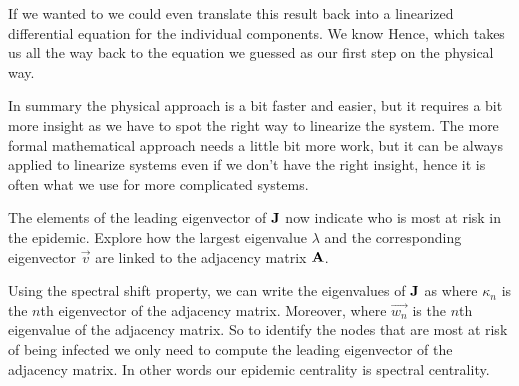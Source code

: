 If we wanted to we could even translate this result back into a linearized differential equation for the individual components. We know 
Hence,
which takes us all the way back to the equation we guessed as our first step on the physical way.  

In summary the physical approach is a bit faster and easier, but it requires a bit more insight as we have to spot the right way to linearize the system. The more formal mathematical approach needs a little bit more work, but it can be always applied to linearize systems even if we don't have the right insight, hence it is often what we use for more complicated systems. 

\subquestion 
The elements of the leading eigenvector of $\bf J$ now indicate who is most at risk in the epidemic. Explore how the largest eigenvalue $\lambda$ and the corresponding eigenvector $\vec{v}$ are linked to the adjacency matrix $\bf A$. 

\solution Using the spectral shift property, we can write the eigenvalues of $\bf J$ as
where $\kappa_n$ is the $n$th eigenvector of the adjacency matrix. Moreover, 
where $\vec{w_n}$ is the $n$th eigenvalue of the adjacency matrix. 
So to identify the nodes that are most at risk of being infected we only need to compute the leading eigenvector of the adjacency matrix. In other words our epidemic centrality is spectral centrality. 
   
